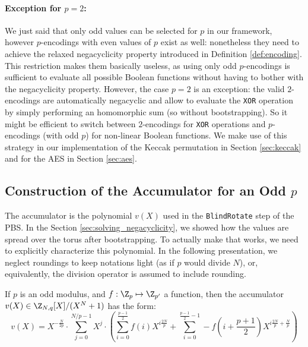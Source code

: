 





\paragraph{Exception for $p=2$:} We just said that only odd values can be selected for $p$ in our framework, however $p$-encodings with even values of $p$ exist as well: nonetheless they need to achieve the relaxed negacyclicity property introduced in Definition \ref{def:encoding}. This restriction makes them basically useless, as using only odd $p$-encodings is sufficient to evaluate all possible Boolean functions without having to bother with the negacyclicity property. However, the case $p=2$ is an exception: the valid $2$-encodings are automatically negacyclic and allow to evaluate the \texttt{XOR} operation by simply performing an homomorphic sum (so without bootstrapping). So it might be efficient to switch between $2$-encodings for \texttt{XOR} operations and $p$-encodings (with odd $p$) for non-linear Boolean functions. We make use of this strategy in our implementation of the Keccak permutation in Section \ref{sec:keccak} and for the AES in Section \ref{sec:aes}.



\subsection{Construction of the Accumulator for an Odd $p$}
\label{sec:accumulator}


The accumulator is the polynomial $v(X)$ used in the \texttt{BlindRotate} step of the PBS. In the Section \ref{sec:solving_negacyclicity}, we showed how the values are spread over the torus after bootstrapping. To actually make that works, we need to explicitly characterize this polynomial. In the following presentation, we neglect roundings to keep notations light (as if $p$ would divide $N$), or, equivalently, the division operator is assumed to include rounding.

\begin{definition}
    If $p$ is an odd modulus, and $f: \Z_p \mapsto \Z_{p'}$ a function, then the accumulator $v(X) \in \Z_{N, q}[X]/(X^N+1)$ has the form:\[v(X) = X^{- \frac {N} {2p}} \cdot \sum_{j=0}^{N/p - 1} X^j  \cdot \left ( \sum_{i=0}^{\frac{p-1}{2}} f(i) X^{i \frac{2N}{p}} + \sum_{i=0}^{\frac{p-1}{2} - 1} -f \left (i + \frac{p+1}{2} \right ) X^{i \frac{2N}{p} + \frac N p} \right )\]
\end{definition}


